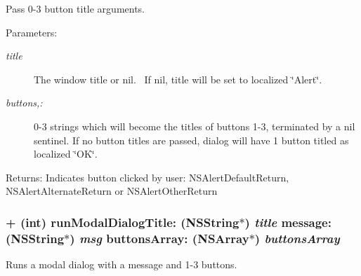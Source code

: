Pass 0-3 button title arguments. \begin{Desc}
\item[Parameters:]
\begin{description}
\item[{\em title}]The window title or nil.~ If nil, title will be set to localized \char`\"{}Alert\char`\"{}. \item[{\em buttons,:}]0-3 strings which will become the titles of buttons 1-3, terminated by a nil sentinel. If no button titles are passed, dialog will have 1 button titled as localized \char`\"{}OK\char`\"{}. \end{description}
\end{Desc}
\begin{Desc}
\item[Returns:]Indicates button clicked by user: NSAlertDefaultReturn, NSAlertAlternateReturn or NSAlertOtherReturn \end{Desc}
\hypertarget{interface_s_s_y_alert_8e294391f819c1e888b41adb2f5ece52}{
\subsubsection[{runModalDialogTitle:message:buttonsArray:}]{\setlength{\rightskip}{0pt plus 5cm}+ (int) runModalDialogTitle: (NSString$\ast$) {\em title}\/ message: (NSString$\ast$) {\em msg}\/ buttonsArray: (NSArray$\ast$) {\em buttonsArray}}}
\label{interface_s_s_y_alert_8e294391f819c1e888b41adb2f5ece52}


Runs a modal dialog with a message and 1-3 buttons. 

